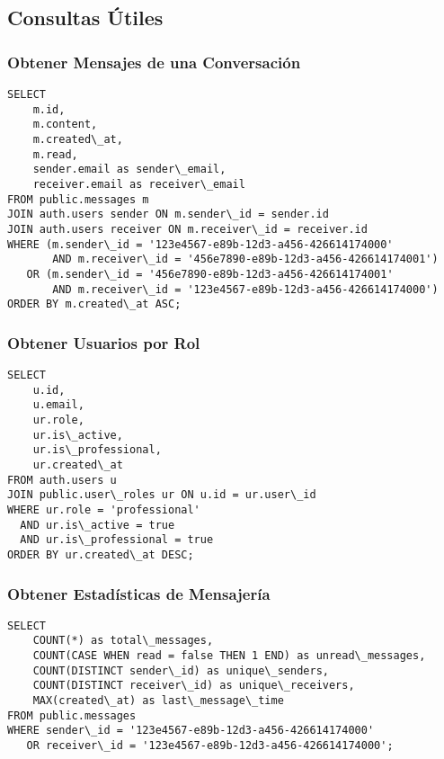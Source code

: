 \documentclass[12pt,a4paper]{article}
\begin{document}
\subsection{Consultas Útiles}

\subsubsection{Obtener Mensajes de una Conversación}

\begin{lstlisting}[caption=Consulta de mensajes de conversación]
SELECT 
    m.id,
    m.content,
    m.created\_at,
    m.read,
    sender.email as sender\_email,
    receiver.email as receiver\_email
FROM public.messages m
JOIN auth.users sender ON m.sender\_id = sender.id
JOIN auth.users receiver ON m.receiver\_id = receiver.id
WHERE (m.sender\_id = '123e4567-e89b-12d3-a456-426614174000' 
       AND m.receiver\_id = '456e7890-e89b-12d3-a456-426614174001')
   OR (m.sender\_id = '456e7890-e89b-12d3-a456-426614174001' 
       AND m.receiver\_id = '123e4567-e89b-12d3-a456-426614174000')
ORDER BY m.created\_at ASC;
\end{lstlisting}

\subsubsection{Obtener Usuarios por Rol}

\begin{lstlisting}[caption=Consulta de usuarios por rol]
SELECT 
    u.id,
    u.email,
    ur.role,
    ur.is\_active,
    ur.is\_professional,
    ur.created\_at
FROM auth.users u
JOIN public.user\_roles ur ON u.id = ur.user\_id
WHERE ur.role = 'professional'
  AND ur.is\_active = true
  AND ur.is\_professional = true
ORDER BY ur.created\_at DESC;
\end{lstlisting}

\subsubsection{Obtener Estadísticas de Mensajería}

\begin{lstlisting}[caption=Consulta de estadísticas de mensajería]
SELECT 
    COUNT(*) as total\_messages,
    COUNT(CASE WHEN read = false THEN 1 END) as unread\_messages,
    COUNT(DISTINCT sender\_id) as unique\_senders,
    COUNT(DISTINCT receiver\_id) as unique\_receivers,
    MAX(created\_at) as last\_message\_time
FROM public.messages
WHERE sender\_id = '123e4567-e89b-12d3-a456-426614174000' 
   OR receiver\_id = '123e4567-e89b-12d3-a456-426614174000';
\end{lstlisting}
\end{document}
